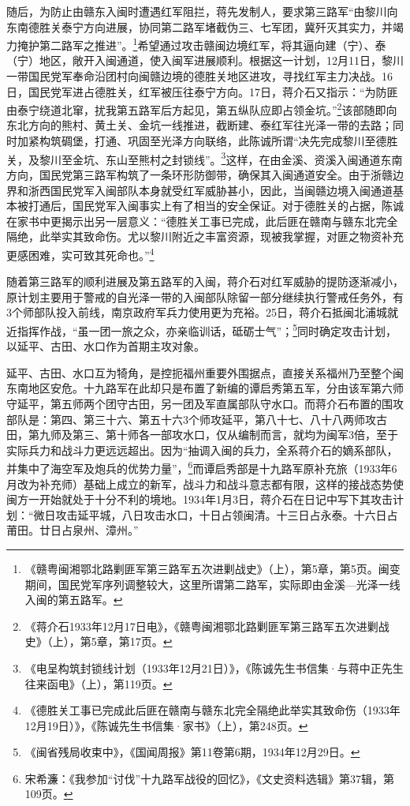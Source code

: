 随后，为防止由赣东入闽时遭遇红军阻拦，蒋先发制人，要求第三路军“由黎川向东南德胜关泰宁方向进展，协同第二路军堵截伪三、七军团，冀歼灭其实力，并竭力掩护第二路军之推进”。\footnote{《赣粤闽湘鄂北路剿匪军第三路军五次进剿战史》（上），第5章，第5页。闽变期间，国民党军序列调整较大，这里所谓第二路军，实际即由金溪—光泽一线入闽的第五路军。}希望通过攻击赣闽边境红军，将其逼向建（宁）、泰（宁）地区，敞开入闽通道，使入闽军进展顺利。根据这一计划，12月11日，黎川一带国民党军奉命沿团村向闽赣边境的德胜关地区进攻，寻找红军主力决战。16日，国民党军进占德胜关，红军被压往泰宁方向。17日，蒋介石又指示：“为防匪由泰宁绕道北窜，扰我第五路军后方起见，第五纵队应即占领金坑。”\footnote{《蒋介石1933年12月17日电》，《赣粤闽湘鄂北路剿匪军第三路军五次进剿战史》（上），第5章，第17页。}该部随即向东北方向的熊村、黄土关、金坑一线推进，截断建、泰红军往光泽一带的去路；同时加紧构筑碉堡，打通、巩固至光泽方向联络，此陈诚所谓“决先完成黎川至德胜关，及黎川至金坑、东山至熊村之封锁线”。\footnote{《电呈构筑封锁线计划（1933年12月21日）》，《陈诚先生书信集·与蒋中正先生往来函电》（上），第119页。}这样，在由金溪、资溪入闽通道东南方向，国民党第三路军构筑了一条环形防御带，确保其入闽通道安全。由于浙赣边界和浙西国民党军入闽部队本身就受红军威胁甚小，因此，当闽赣边境入闽通道基本被打通后，国民党军入闽事实上有了相当的安全保证。对于德胜关的占据，陈诚在家书中更揭示出另一层意义：“德胜关工事已完成，此后匪在赣南与赣东北完全隔绝，此举实其致命伤。尤以黎川附近之丰富资源，现被我掌握，对匪之物资补充更感困难，实可致其死命也。”\footnote{《德胜关工事已完成此后匪在赣南与赣东北完全隔绝此举实其致命伤（1933年12月19日）》，《陈诚先生书信集·家书》（上），第248页。}


随着第三路军的顺利进展及第五路军的入闽，蒋介石对红军威胁的提防逐渐减小，原计划主要用于警戒的自光泽一带的入闽部队除留一部分继续执行警戒任务外，有3个师部队投入前线，南京政府军兵力使用更为充裕。25日，蒋介石抵闽北浦城就近指挥作战，“虽一团一旅之众，亦亲临训话，砥砺士气”；\footnote{《闽省残局收束中》，《国闻周报》第11卷第6期，1934年12月29日。}同时确定攻击计划，以延平、古田、水口作为首期主攻对象。


延平、古田、水口互为犄角，是控扼福州重要外围据点，直接关系福州乃至整个闽东南地区安危。十九路军在此却只是布置了新编的谭启秀第五军，分由该军第六师守延平，第五师两个团守古田，另一团及军直属部队守水口。而蒋介石布置的围攻部队是：第四、第三十六、第五十六3个师攻延平，第八十七、八十八两师攻古田，第九师及第三、第十师各一部攻水口，仅从编制而言，就均为闽军3倍，至于实际兵力和战斗力更远远超出。因为“抽调入闽的兵力，全系蒋介石的嫡系部队，并集中了海空军及炮兵的优势力量”，\footnote{宋希濂：《我参加“讨伐”十九路军战役的回忆》，《文史资料选辑》第37辑，第109页。}而谭启秀部是十九路军原补充旅（1933年6月改为补充师）基础上成立的新军，战斗力和战斗意志都有限，这样的接战态势使闽方一开始就处于十分不利的境地。1934年1月3日，蒋介石在日记中写下其攻击计划：“微日攻击延平城，八日攻击水口，十日占领闽清。十三日占永泰。十六日占莆田。廿日占泉州、漳州。”


